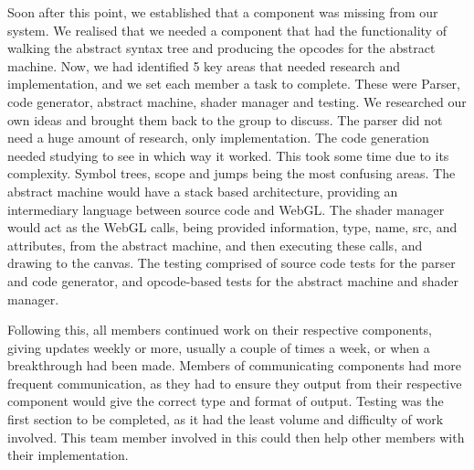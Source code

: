 \documentclass{l3proj}
\begin{document}
Soon after this point, we established that a component was missing from our system. We realised that we needed a component that had the functionality of walking the abstract syntax tree and producing the opcodes for the abstract machine. Now, we had identified 5 key areas that needed research and implementation, and we set each member a task to complete. These were Parser, code generator, abstract machine, shader manager and testing. We researched our own ideas and brought them back to the group to discuss. The parser did not need a huge amount of research, only implementation. The code generation needed studying to see in which way it worked. This took some time due to its complexity. Symbol trees, scope and jumps being the most confusing areas. The abstract machine would have a stack based architecture, providing an intermediary language between source code and WebGL. The shader manager would act as the WebGL calls, being provided information, type, name, src, and attributes, from the abstract machine, and then executing these calls, and drawing to the canvas. The testing comprised of source code tests for the parser and code generator, and opcode-based tests for the abstract machine and shader manager.

Following this, all members continued work on their respective components, giving updates weekly or more, usually a couple of times a week, or when a breakthrough had been made. Members of communicating components had more frequent communication, as they had to ensure they output from their respective component would give the correct type and format of output. Testing was the first section to be completed, as it had the least volume and difficulty of work involved. This team member involved in this could then help other members with their implementation.
\end{document}

